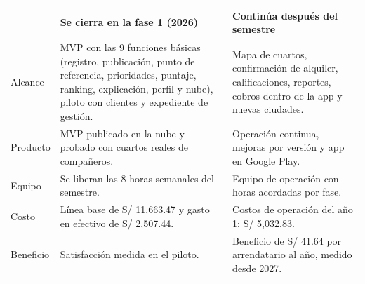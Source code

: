 \documentclass[11pt,a4paper]{article}
\begin{document}
\vspace{0.1cm}
{\small
{}
\noindent\begin{tabularx}{\textwidth}{@{}P{3.6cm} L L@{}}
\toprule
{}
& \textbf{Se cierra en la fase 1 (2026)} & \textbf{Continúa después del semestre} \\
\midrule
Alcance & MVP con las 9 funciones básicas (registro, publicación, punto de referencia, prioridades, puntaje, ranking, explicación, perfil y nube), piloto con clientes y expediente de gestión. & Mapa de cuartos, confirmación de alquiler, calificaciones, reportes, cobros dentro de la app y nuevas ciudades. \\
Producto & MVP publicado en la nube y probado con cuartos reales de compañeros. & Operación continua, mejoras por versión y app en Google Play. \\
Equipo & Se liberan las 8 horas semanales del semestre. & Equipo de operación con horas acordadas por fase. \\
Costo & Línea base de S/ 11,663.47 y gasto en efectivo de S/ 2,507.44. & Costos de operación del año 1: S/ 5,032.83. \\
Beneficio & Satisfacción medida en el piloto. & Beneficio de S/ 41.64 por arrendatario al año, medido desde 2027. \\
\bottomrule
\end{tabularx}
}
\end{document}
